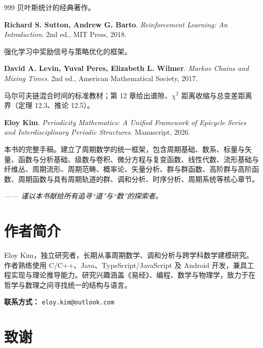 \begin{thebibliography}{999}
贝叶斯统计的经典著作。

 \textbf{Richard S. Sutton, Andrew G. Barto}. \textit{Reinforcement Learning: An Introduction}. 2nd ed., MIT Press, 2018.

强化学习中奖励信号与策略优化的框架。

 \textbf{David A. Levin, Yuval Peres, Elizabeth L. Wilmer}. \textit{Markov Chains and Mixing Times}. 2nd ed., American Mathematical Society, 2017.

马尔可夫链混合时间的标准教材；第 12 章给出谱隙、$\chi^2$ 距离收缩与总变差距离界（定理 12.3、推论 12.5）。

 \textbf{Eloy Kim}. \textit{Periodicity Mathematics: A Unified Framework of Epicycle Series and Interdisciplinary Periodic Structures}. Manuscript, 2026.

本书的完整手稿。建立了周期数学的统一框架，包含周期基础、数系、标量与矢量、函数与分析基础、级数与卷积、微分方程与复变函数、线性代数、流形基础与纤维丛、周期流形、周期范畴、概率论、矢量分析、群与群函数、高阶群与高阶函数、周期函数与具有周期轨道的群、调和分析、时序分析、周期系统等核心章节。

\end{thebibliography}

\endgroup


\vspace{1cm}
\begin{flushright}
\textit{—— 谨以本书献给所有追寻“道”与“数”的探索者。}
\end{flushright}

\cleardoublepage
{}
{}
\chapter*{作者简介}

Eloy Kim，独立研究者，长期从事周期数学、调和分析与跨学科数学建模研究。作者熟练使用 C/C++、Java、TypeScript/JavaScript 及 Android 开发，兼具工程实现与理论推导能力。研究兴趣涵盖《易经》、编程、数学与物理学，致力于在哲学与数理之间寻找统一的结构与语言。

\vspace{1em}
\noindent\textbf{联系方式：} \texttt{eloy.kim@outlook.com}

\cleardoublepage
{}
{}
\chapter*{致谢}

